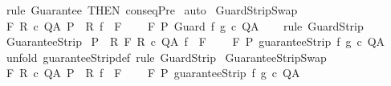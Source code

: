 \begin{isabellebody}
%
\isadelimproof
%
\endisadelimproof
%
\isatagproof
{}\isamarkupfalse%
\ {\isacharparenleft}rule\ Guarantee\ {\isacharbrackleft}THEN\ conseqPre{\isacharbrackright}{\isacharparenright}\isanewline
{}\isamarkupfalse%
\ auto\isanewline
{}\isamarkupfalse%
%
\endisatagproof
{\isafoldproof}%
%
\isadelimproof
\isanewline
%
\endisadelimproof
\isanewline
{}\isamarkupfalse%
\ GuardStripSwap{\isacharcolon}\isanewline
\ {\isachardoublequoteopen}{\isasymlbrakk}{\isasymGamma}{\isacharcomma}{\isasymTheta}{\isasymturnstile}\isactrlbsub {\isacharslash}F\isactrlesub \ R\ c\ Q{\isacharcomma}A{\isacharsemicolon}\ P\ {\isasymsubseteq}\ R{\isacharsemicolon}\ f\ {\isasymin}\ F{\isasymrbrakk}\ \isanewline
\ \ {\isasymLongrightarrow}\ {\isasymGamma}{\isacharcomma}{\isasymTheta}{\isasymturnstile}\isactrlbsub {\isacharslash}F\isactrlesub \ P\ {\isacharparenleft}Guard\ f\ g\ c{\isacharparenright}\ Q{\isacharcomma}A{\isachardoublequoteclose}\isanewline
%
\isadelimproof
\ \ %
\endisadelimproof
%
\isatagproof
{}\isamarkupfalse%
\ {\isacharparenleft}rule\ GuardStrip{\isacharparenright}%
\endisatagproof
{\isafoldproof}%
%
\isadelimproof
\isanewline
%
\endisadelimproof
\isanewline
{}\isamarkupfalse%
\ GuaranteeStrip{\isacharcolon}\isanewline
\ {\isachardoublequoteopen}{\isasymlbrakk}P\ {\isasymsubseteq}\ R{\isacharsemicolon}\ {\isasymGamma}{\isacharcomma}{\isasymTheta}{\isasymturnstile}\isactrlbsub {\isacharslash}F\isactrlesub \ R\ c\ Q{\isacharcomma}A{\isacharsemicolon}\ f\ {\isasymin}\ F{\isasymrbrakk}\ \isanewline
\ \ {\isasymLongrightarrow}\ {\isasymGamma}{\isacharcomma}{\isasymTheta}{\isasymturnstile}\isactrlbsub {\isacharslash}F\isactrlesub \ P\ {\isacharparenleft}guaranteeStrip\ f\ g\ c{\isacharparenright}\ Q{\isacharcomma}A{\isachardoublequoteclose}\isanewline
%
\isadelimproof
\ \ %
\endisadelimproof
%
\isatagproof
{}\isamarkupfalse%
\ {\isacharparenleft}unfold\ guaranteeStrip{\isacharunderscore}def{\isacharparenright}\ {\isacharparenleft}rule\ GuardStrip{\isacharparenright}%
\endisatagproof
{\isafoldproof}%
%
\isadelimproof
\isanewline
%
\endisadelimproof
\isanewline
{}\isamarkupfalse%
\ GuaranteeStripSwap{\isacharcolon}\isanewline
\ {\isachardoublequoteopen}{\isasymlbrakk}{\isasymGamma}{\isacharcomma}{\isasymTheta}{\isasymturnstile}\isactrlbsub {\isacharslash}F\isactrlesub \ R\ c\ Q{\isacharcomma}A{\isacharsemicolon}\ P\ {\isasymsubseteq}\ R{\isacharsemicolon}\ f\ {\isasymin}\ F{\isasymrbrakk}\ \isanewline
\ \ {\isasymLongrightarrow}\ {\isasymGamma}{\isacharcomma}{\isasymTheta}{\isasymturnstile}\isactrlbsub {\isacharslash}F\isactrlesub \ P\ {\isacharparenleft}guaranteeStrip\ f\ g\ c{\isacharparenright}\ Q{\isacharcomma}A{\isachardoublequoteclose}\isanewline

\end{isabellebody}

